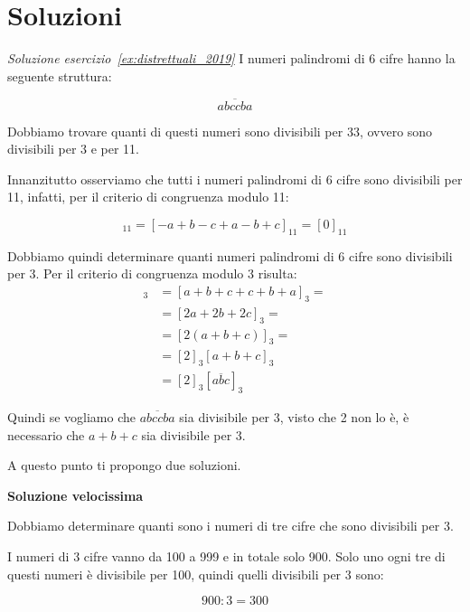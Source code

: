 \chapter{Soluzioni}
\label{ch:soluzioni}

\begin{soluzione}
    \emph{Soluzione esercizio~\ref{ex:distrettuali_2019}}
    I numeri palindromi di 6 cifre hanno la seguente struttura:

    \begin{equation*}
        \overline{abccba}
    \end{equation*}

    Dobbiamo trovare quanti di questi numeri sono divisibili per 33, ovvero sono divisibili per 3 e per 11.

    Innanzitutto osserviamo che tutti i numeri palindromi di 6 cifre sono divisibili per 11, infatti, per il
    criterio di congruenza modulo 11:

    \begin{equation*}
        [\overline{abccba}]_{11} = [-a + b - c + a - b + c]_{11} = [0]_{11}
    \end{equation*}

    Dobbiamo quindi determinare quanti numeri palindromi di 6 cifre sono divisibili per 3.
    Per il criterio di congruenza modulo 3 risulta:
    \begin{align*}
        [\overline{abccba}]_3 &= [a + b + c + c + b + a]_3 = \\
        &= [2a + 2b + 2c]_3 = \\
        &= [2(a+b+c)]_3 = \\
        &= [2]_3[a + b + c]_3 \\
        &= [2]_3[\overline{abc}]_3
    \end{align*}

    Quindi se vogliamo che $\overline{abccba}$ sia divisibile per 3, visto che 2 non lo è, è necessario che $a + b + c$
    sia divisibile per 3.

    A questo punto ti propongo due soluzioni.

    \bigskip
    \textbf{Soluzione velocissima}

    Dobbiamo determinare quanti sono i numeri di tre cifre che sono divisibili per 3.

    I numeri di 3 cifre vanno da 100 a 999 e in totale solo 900.
    Solo uno ogni tre di questi numeri è divisibile per 100, quindi quelli divisibili per 3 sono:

    \begin{equation*}
        900 : 3 = 300
    \end{equation*}


\end{soluzione}
